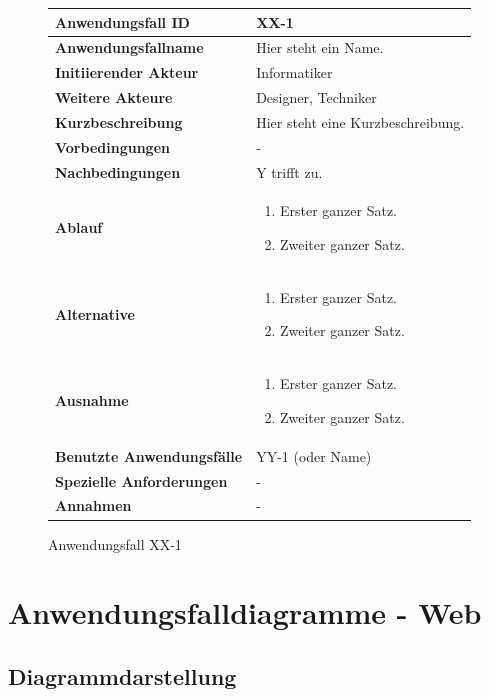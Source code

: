 \begin{figure}[h]
	\centering
	\begin{tabularx}{\textwidth}{ X | X }
		\textbf{Anwendungsfall ID} & XX-1 \\ \hline
		\textbf{Anwendungsfallname} & Hier steht ein Name. \\ \hline
		\textbf{Initiierender Akteur} & Informatiker \\ \hline
		\textbf{Weitere Akteure} & Designer, Techniker  \\ \hline
		\textbf{Kurzbeschreibung} & Hier steht eine Kurzbeschreibung.  \\ \hline
		\textbf{Vorbedingungen} & -  \\ \hline
		\textbf{Nachbedingungen} & Y trifft zu.  \\ \hline
		\textbf{Ablauf} &
		\begin{enumerate}
			\item Erster ganzer Satz.
			\item Zweiter ganzer Satz.
		\end{enumerate} \\ \hline
		\textbf{Alternative} &
		\begin{enumerate}
			\item Erster ganzer Satz.
			\item Zweiter ganzer Satz.
		\end{enumerate}  \\ \hline
		\textbf{Ausnahme} &
		\begin{enumerate}
			\item Erster ganzer Satz.
			\item Zweiter ganzer Satz.
		\end{enumerate}  \\ \hline
		\textbf{Benutzte Anwendungsfälle} & YY-1 (oder Name) \\ \hline
		\textbf{Spezielle Anforderungen} & - \\ \hline
		\textbf{Annahmen} & -
	\end{tabularx}
	\caption{Anwendungsfall XX-1}
	\label{fig:anwendungsfall-server-tabelle-xx-1}
\end{figure}

\clearpage

\section{Anwendungsfalldiagramme - Web}
\subsection{Diagrammdarstellung}

